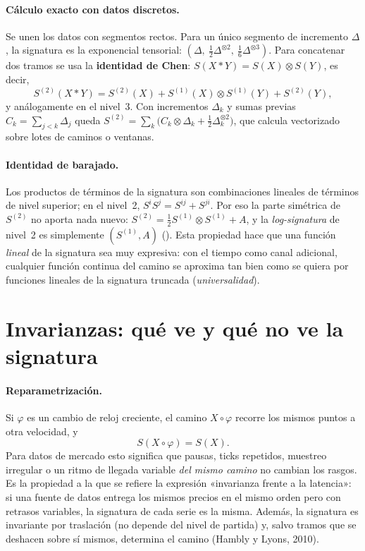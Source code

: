 \paragraph{Cálculo exacto con datos discretos.} Se unen los datos con segmentos rectos. Para un único
segmento de incremento $\Delta$, la signatura es la exponencial tensorial:
$(\Delta,\ \tfrac12\Delta^{\otimes2},\ \tfrac16\Delta^{\otimes3})$. Para concatenar dos tramos se usa la
\textbf{identidad de Chen}: $S(X\ast Y)=S(X)\otimes S(Y)$, es decir,
\begin{equation}\label{eq:chen}
S^{(2)}(X\ast Y)=S^{(2)}(X)+S^{(1)}(X)\otimes S^{(1)}(Y)+S^{(2)}(Y),
\end{equation}
y análogamente en el nivel~3. Con incrementos $\Delta_k$ y sumas previas $C_k=\sum_{j<k}\Delta_j$ queda
$S^{(2)}=\sum_k\big(C_k\otimes\Delta_k+\tfrac12\Delta_k^{\otimes2}\big)$, que 
calcula vectorizado sobre lotes de caminos o ventanas.

\paragraph{Identidad de barajado.} Los productos de términos de la signatura son combinaciones lineales
de términos de nivel superior; en el nivel~2, $S^iS^j=S^{ij}+S^{ji}$. Por eso la parte simétrica de
$S^{(2)}$ no aporta nada nuevo: $S^{(2)}=\tfrac12 S^{(1)}\otimes S^{(1)}+A$, y la
\emph{log-signatura} de nivel~2 es simplemente $(S^{(1)},A)$ (). Esta
propiedad hace que una función \emph{lineal} de la signatura sea muy expresiva: con el tiempo como
canal adicional, cualquier función continua del camino se aproxima tan bien como se quiera por funciones
lineales de la signatura truncada (\emph{universalidad}).

\section{Invarianzas: qué ve y qué no ve la signatura}
\paragraph{Reparametrización.} Si $\varphi$ es un cambio de reloj creciente, el camino $X\circ\varphi$
recorre los mismos puntos a otra velocidad, y
\begin{equation}
S(X\circ\varphi)=S(X).
\end{equation}
Para datos de mercado esto significa que pausas, ticks repetidos, muestreo irregular o un ritmo de
llegada variable \emph{del mismo camino} no cambian los rasgos. Es la propiedad a la que se refiere la
expresión «invarianza frente a la latencia»: si una fuente de datos entrega los mismos precios en el
mismo orden pero con retrasos variables, la signatura de cada serie es la misma. Además, la signatura
es invariante por traslación (no depende del nivel de partida) y, salvo tramos que se deshacen sobre sí
mismos, determina el camino (Hambly y Lyons, 2010).

